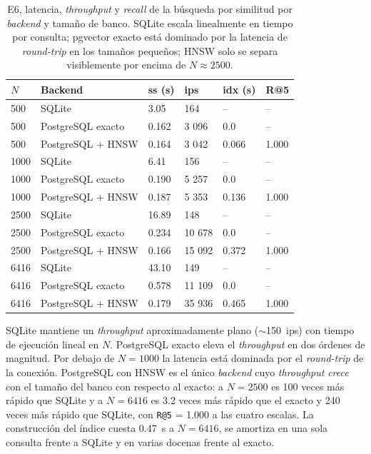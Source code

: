 \begin{table}[h]
  \centering
{\footnotesize
\begin{tabular}{|p{1.0cm}|p{2.6cm}|p{1.6cm}|p{2.0cm}|p{1.6cm}|p{1.8cm}|} \hline
  \textbf{$N$} & \textbf{Backend} & \textbf{ss (s)} & \textbf{ips} & \textbf{idx (s)} & \textbf{R@5} \\ \hline
   500 & SQLite             & 3.05  &    164 & --     & --    \\ \hline
   500 & PostgreSQL exacto  & 0.162 &  3 096 & 0.0    & --    \\ \hline
   500 & PostgreSQL + HNSW  & 0.164 &  3 042 & 0.066  & 1.000 \\ \hline
  1000 & SQLite             & 6.41  &    156 & --     & --    \\ \hline
  1000 & PostgreSQL exacto  & 0.190 &  5 257 & 0.0    & --    \\ \hline
  1000 & PostgreSQL + HNSW  & 0.187 &  5 353 & 0.136  & 1.000 \\ \hline
  2500 & SQLite             & 16.89 &    148 & --     & --    \\ \hline
  2500 & PostgreSQL exacto  & 0.234 & 10 678 & 0.0    & --    \\ \hline
  2500 & PostgreSQL + HNSW  & 0.166 & 15 092 & 0.372  & 1.000 \\ \hline
  6416 & SQLite             & 43.10 &    149 & --     & --    \\ \hline
  6416 & PostgreSQL exacto  & 0.578 & 11 109 & 0.0    & --    \\ \hline
  6416 & PostgreSQL + HNSW  & 0.179 & 35 936 & 0.465  & 1.000 \\ \hline
\end{tabular}
}
  \caption[E6, latencia y \textit{recall} por \textit{backend}]{E6, latencia, \textit{throughput} y \textit{recall} de la búsqueda
  por similitud por \textit{backend} y tamaño de banco. SQLite escala
  linealmente en tiempo por consulta; pgvector exacto está dominado por la
  latencia de \textit{round-trip} en los tamaños pequeños; HNSW solo se
  separa visiblemente por encima de $N\approx 2500$.}
  \label{tab:e6-storage}
\end{table}

SQLite mantiene un \textit{throughput} aproximadamente plano ($\sim$150~ips)
con tiempo de ejecución lineal en $N$. PostgreSQL exacto eleva el
\textit{throughput} en dos órdenes de magnitud. Por debajo de $N=1000$ la
latencia está dominada por el \textit{round-trip} de la conexión. PostgreSQL
con HNSW es el único \textit{backend} cuyo \textit{throughput} \emph{crece} con
el tamaño del banco con respecto al exacto: a $N=2500$ es 100 veces más rápido
que SQLite y a $N=6416$ es 3.2 veces más rápido que el exacto y 240 veces más
rápido que SQLite, con \texttt{R@5} = 1.000 a las cuatro escalas. La
construcción del índice cuesta 0.47~s a $N=6416$, se amortiza en una sola
consulta frente a SQLite y en varias docenas frente al exacto.


